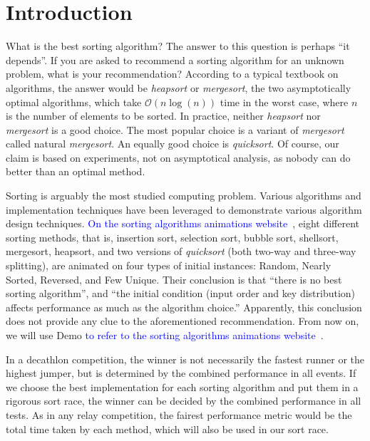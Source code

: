\documentclass[AMA,STIX1COL]{WileyNJD-v2}
\newcommand{\qusort}{\emph{quicksort }}
\newcommand{\qusortn}{\emph{quicksort}}
\newcommand{\msort}{\emph{mergesort }}
\newcommand{\msortn}{\emph{mergesort}}
\begin{document}
\section{Introduction}\label{sec1}

What is the best sorting algorithm?
The answer to this question is perhaps ``it depends”.  
If you are asked to recommend a sorting algorithm for an unknown problem, what is your recommendation?
According to a typical textbook on algorithms, the answer would be \emph{heapsort} or \msortn, the two asymptotically optimal algorithms, which take $\mathcal{O}(n\log(n))$ time in the worst case, where $n$ is the number of elements to be sorted. 
In practice, neither \emph{heapsort} nor \msort is a good choice. 
The most popular choice is a variant of \msort called natural \msortn. 
An equally good choice is \qusortn. 
Of course, our claim is based on experiments, not on asymptotical analysis, as nobody can do better than an optimal method. 

Sorting is arguably the most studied computing problem. 
Various algorithms and implementation techniques have been leveraged to demonstrate various algorithm design techniques.  
\textcolor{blue}{On the sorting algorithms animations website~\cite{animations}}, eight different sorting methods, that is, insertion sort, selection sort, bubble sort, shellsort, mergesort, heapsort, and two versions of \qusort (both two-way and three-way splitting), are animated on four types of initial instances: Random, Nearly Sorted, Reversed, and Few Unique. 
Their conclusion is that “there is no best sorting algorithm”, and “the initial condition (input order and key distribution) affects performance as much as the algorithm choice.” 
Apparently, this conclusion does not provide any clue to the aforementioned recommendation. 
From now on, we will use Demo \textcolor{blue}{to refer to the sorting algorithms animations website~\cite{animations}}.

In a decathlon competition, the winner is not necessarily the fastest runner or the highest jumper, but is determined by the combined performance in all events. 
If we choose the best implementation for each sorting algorithm and put them in a rigorous sort race, the winner can be decided by the combined performance in all tests. 
As in any relay competition, the fairest performance metric would be the total time taken by each method, which will also be used in our sort race. 
\end{document}
